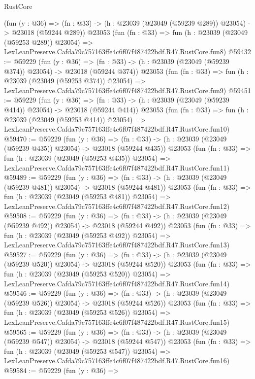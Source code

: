 \begin{lexlean}{RustCore}
\begin{coremodule}
    (fun (y : @36) =>
    (fn : @33) -> (h : @23039 (@23049 (@59239 @289)) @23054) -> @23018 (@59244 @289))
    @23053
    (fun (fn : @33) =>
    fun (h : @23039 (@23049 (@59253 @289)) @23054) =>
    LexLeanPreserve.Cafda79c757163ffe4c6f07f487422bdf.R47.RustCore.fun8)
@59432 := @59229
    (fun (y : @36) =>
    (fn : @33) -> (h : @23039 (@23049 (@59239 @374)) @23054) -> @23018 (@59244 @374))
    @23053
    (fun (fn : @33) =>
    fun (h : @23039 (@23049 (@59253 @374)) @23054) =>
    LexLeanPreserve.Cafda79c757163ffe4c6f07f487422bdf.R47.RustCore.fun9)
@59451 := @59229
    (fun (y : @36) =>
    (fn : @33) -> (h : @23039 (@23049 (@59239 @414)) @23054) -> @23018 (@59244 @414))
    @23053
    (fun (fn : @33) =>
    fun (h : @23039 (@23049 (@59253 @414)) @23054) =>
    LexLeanPreserve.Cafda79c757163ffe4c6f07f487422bdf.R47.RustCore.fun10)
@59470 := @59229
    (fun (y : @36) =>
    (fn : @33) -> (h : @23039 (@23049 (@59239 @435)) @23054) -> @23018 (@59244 @435))
    @23053
    (fun (fn : @33) =>
    fun (h : @23039 (@23049 (@59253 @435)) @23054) =>
    LexLeanPreserve.Cafda79c757163ffe4c6f07f487422bdf.R47.RustCore.fun11)
@59489 := @59229
    (fun (y : @36) =>
    (fn : @33) -> (h : @23039 (@23049 (@59239 @481)) @23054) -> @23018 (@59244 @481))
    @23053
    (fun (fn : @33) =>
    fun (h : @23039 (@23049 (@59253 @481)) @23054) =>
    LexLeanPreserve.Cafda79c757163ffe4c6f07f487422bdf.R47.RustCore.fun12)
@59508 := @59229
    (fun (y : @36) =>
    (fn : @33) -> (h : @23039 (@23049 (@59239 @492)) @23054) -> @23018 (@59244 @492))
    @23053
    (fun (fn : @33) =>
    fun (h : @23039 (@23049 (@59253 @492)) @23054) =>
    LexLeanPreserve.Cafda79c757163ffe4c6f07f487422bdf.R47.RustCore.fun13)
@59527 := @59229
    (fun (y : @36) =>
    (fn : @33) -> (h : @23039 (@23049 (@59239 @520)) @23054) -> @23018 (@59244 @520))
    @23053
    (fun (fn : @33) =>
    fun (h : @23039 (@23049 (@59253 @520)) @23054) =>
    LexLeanPreserve.Cafda79c757163ffe4c6f07f487422bdf.R47.RustCore.fun14)
@59546 := @59229
    (fun (y : @36) =>
    (fn : @33) -> (h : @23039 (@23049 (@59239 @526)) @23054) -> @23018 (@59244 @526))
    @23053
    (fun (fn : @33) =>
    fun (h : @23039 (@23049 (@59253 @526)) @23054) =>
    LexLeanPreserve.Cafda79c757163ffe4c6f07f487422bdf.R47.RustCore.fun15)
@59565 := @59229
    (fun (y : @36) =>
    (fn : @33) -> (h : @23039 (@23049 (@59239 @547)) @23054) -> @23018 (@59244 @547))
    @23053
    (fun (fn : @33) =>
    fun (h : @23039 (@23049 (@59253 @547)) @23054) =>
    LexLeanPreserve.Cafda79c757163ffe4c6f07f487422bdf.R47.RustCore.fun16)
@59584 := @59229
    (fun (y : @36) =>

\end{coremodule}
\end{lexlean}
